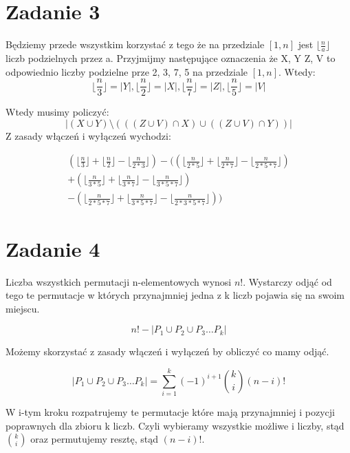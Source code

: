 \documentclass{article}
\begin{document}
\section*{Zadanie 3}
Będziemy przede wszystkim korzystać z tego że na przedziale $[1, n]$ jest $\lfloor \frac{n}{a} \rfloor$ liczb podzielnych przez a. Przyjmijmy następujące oznaczenia że X, Y Z, V to odpowiednio liczby podzielne prze 2, 3, 7, 5 na przedziale $[1, n]$. Wtedy:
 \[\lfloor \frac{n}{3} \rfloor = |Y|, \lfloor \frac{n}{2} \rfloor = |X|, \lfloor \frac{n}{7} \rfloor = |Z|, \lfloor \frac{n}{5} \rfloor = |V|\]

Wtedy musimy policzyć:
 \[ |(X \cup Y) \setminus (((Z \cup V) \cap X ) \cup ((Z \cup V) \cap Y )) |\]
Z zasady włączeń i wyłączeń wychodzi:


\[ 
    \begin{aligned}
    (\lfloor \frac{n}{3} \rfloor + \lfloor \frac{n}{2} \rfloor - \lfloor \frac{n}{2*3} \rfloor )
    -(
     (\lfloor \frac{n}{2 * 5} \rfloor + \lfloor \frac{n}{2 * 7} \rfloor - \lfloor \frac{n}{2*5*7} \rfloor ) \\
     + (\lfloor \frac{n}{3 * 5} \rfloor + \lfloor \frac{n}{3 * 7} \rfloor - \lfloor \frac{n}{3*5*7} \rfloor ) \\
     - (\lfloor \frac{n}{2*5*7} \rfloor +  \lfloor \frac{n}{3*5*7} \rfloor - \lfloor \frac{n}{2*3*5*7} \rfloor)
    )
    \end{aligned}
    \]

\section*{Zadanie 4}

Liczba wszystkich permutacji n-elementowych wynosi $n!$. Wystarczy odjąć od tego te permutacje w których przynajmniej jedna z k liczb pojawia się na swoim miejscu.

\[ n! - | P_1 \cup P_2 \cup P_3 \dots P_k |\]

Możemy skorzystać z zasady włączeń i wyłączeń by obliczyć co mamy odjąć. 

\[ | P_1 \cup P_2 \cup P_3 \dots P_k | = \sum^k_{i=1} (-1)^{i+1} {k \choose i} (n-i)! \]

W i-tym kroku rozpatrujemy te permutacje które mają przynajmniej i pozycji poprawnych dla zbioru k liczb. Czyli wybieramy wszystkie możliwe i liczby, stąd $ k \choose i$ oraz permutujemy resztę, stąd $(n-i)!$.
\end{document}
